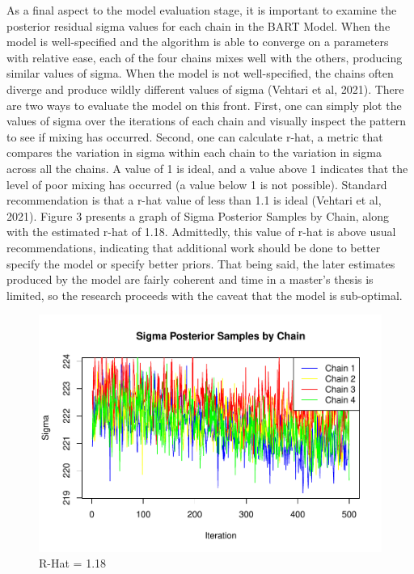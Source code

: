 \documentclass[
  12pt,
]{article}
\begin{document}
As a final aspect to the model evaluation stage, it is important to
examine the posterior residual sigma values for each chain in the BART
Model. When the model is well-specified and the algorithm is able to
converge on a parameters with relative ease, each of the four chains
mixes well with the others, producing similar values of sigma. When the
model is not well-specified, the chains often diverge and produce wildly
different values of sigma (Vehtari et al, 2021). There are two ways to
evaluate the model on this front. First, one can simply plot the values
of sigma over the iterations of each chain and visually inspect the
pattern to see if mixing has occurred. Second, one can calculate r-hat,
a metric that compares the variation in sigma within each chain to the
variation in sigma across all the chains. A value of 1 is ideal, and a
value above 1 indicates that the level of poor mixing has occurred (a
value below 1 is not possible). Standard recommendation is that a r-hat
value of less than 1.1 is ideal (Vehtari et al, 2021). Figure 3 presents
a graph of Sigma Posterior Samples by Chain, along with the estimated
r-hat of 1.18. Admittedly, this value of r-hat is above usual
recommendations, indicating that additional work should be done to
better specify the model or specify better priors. That being said, the
later estimates produced by the model are fairly coherent and time in a
master's thesis is limited, so the research proceeds with the caveat
that the model is sub-optimal.

\begin{figure}
\centering
\includegraphics{thesis-draft-1_files/figure-latex/unnamed-chunk-13-1.pdf}
\caption{R-Hat = 1.18}
\end{figure}
\end{document}
